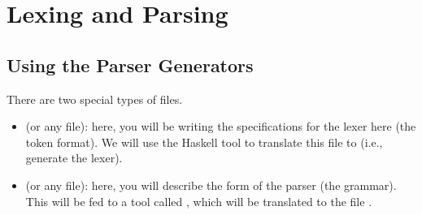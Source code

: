 \documentclass[letterpaper]{article}
\begin{document}
\section{Lexing and Parsing}
\subsection{Using the Parser Generators}
There are two special types of files. 
\begin{itemize}
    \item {} (or any  file): here, you will be writing the specifications for the lexer here (the token format). We will use the Haskell tool  to translate this file to  (i.e., generate the lexer).
    \item {} (or any  file): here, you will describe the form of the parser (the grammar). This will be fed to a tool called , which will be translated to the file .
\end{itemize}
\end{document}
